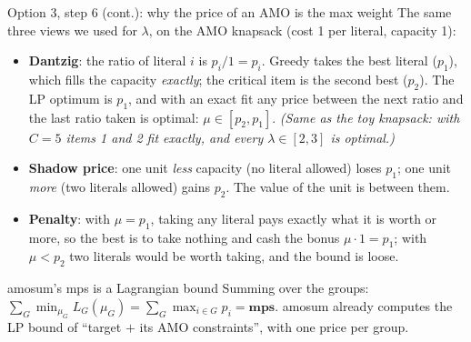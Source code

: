\documentclass[aspectratio=169,11pt]{beamer}
\begin{document}
\begin{frame}{Option 3, step 6 (cont.): why the price of an AMO is the max weight}
\footnotesize
The same three views we used for $\lambda$, on the AMO knapsack (cost 1 per literal, capacity 1):
\begin{itemize}\setlength\itemsep{4pt}
\item \textbf{Dantzig}: the ratio of literal $i$ is $p_i / 1 = p_i$. Greedy takes the best literal ($p_1$), which fills the
  capacity \emph{exactly}; the critical item is the second best ($p_2$). The LP optimum is $p_1$, and with an exact fit
  any price between the next ratio and the last ratio taken is optimal: $\mu \in [p_2, p_1]$.
  \emph{(Same as the toy knapsack: with $C = 5$ items 1 and 2 fit exactly, and every $\lambda \in [2,3]$ is optimal.)}
\item \textbf{Shadow price}: one unit \emph{less} capacity (no literal allowed) loses $p_1$; one unit \emph{more} (two
  literals allowed) gains $p_2$. The value of the unit is between them.
\item \textbf{Penalty}: with $\mu = p_1$, taking any literal pays exactly what it is worth or more, so the best is to take
  nothing and cash the bonus $\mu\cdot 1 = p_1$; with $\mu < p_2$ two literals would be worth taking, and the bound is loose.
\end{itemize}
\vspace{2mm}
\begin{block}{amosum's mps is a Lagrangian bound}
Summing over the groups: $\displaystyle\sum_G \min_{\mu_G} L_G(\mu_G) = \sum_G \max_{i\in G} p_i = \textbf{mps}$.
amosum already computes the LP bound of ``target $+$ its AMO constraints'', with one price per group.
\end{block}
\end{frame}
\end{document}
